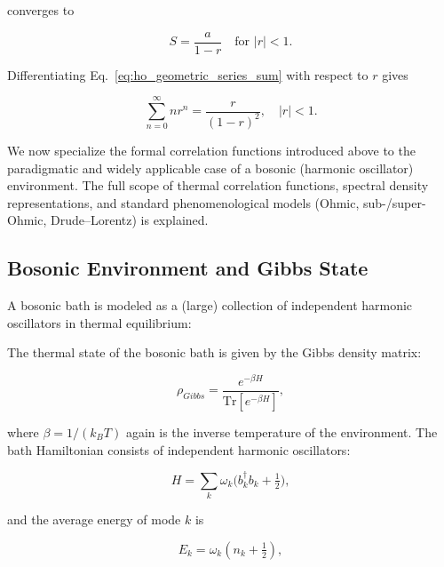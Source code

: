 \noindent
converges to

\begin{equation} \label{eq:ho_geometric_series_sum}
	S = \frac{a}{1-r} \quad \text{for } |r|<1.
\end{equation}

\noindent
Differentiating Eq.~\eqref{eq:ho_geometric_series_sum} with respect to $r$ gives

\begin{equation} \label{eq:ho_derivation_geometric_sum}
	\sum_{n=0}^{\infty} n r^n = \frac{r}{(1-r)^2}, \quad |r|<1.
\end{equation}

\noindent
We now specialize the formal correlation functions introduced above to the paradigmatic and widely applicable case of a bosonic (harmonic oscillator) environment. The full scope of thermal correlation functions, spectral density representations, and standard phenomenological models (Ohmic, sub-/super-Ohmic, Drude--Lorentz) is explained.


\subsection{Bosonic Environment and Gibbs State}
\label{subsec:bosonic_environment_gibbs}

\noindent
A bosonic bath is modeled as a (large) collection of independent harmonic oscillators in thermal equilibrium:

The thermal state of the bosonic bath is given by the Gibbs density matrix:

\begin{equation} \label{eq:ho_gibbs_state}
    \rho_{Gibbs} = \frac{e^{-\beta H}}{\mathrm{Tr}[e^{-\beta H}]},
\end{equation}

\noindent
where $\beta = 1/(k_B T)$ again is the inverse temperature of the environment. The bath Hamiltonian consists of independent harmonic oscillators:

\begin{equation}
    H = \sum_k \omega_k \Big(b_k^{\dagger} b_k + \tfrac{1}{2}\Big),
	\label{eq:ho_bath_hamiltonian}
\end{equation}

\noindent
and the average energy of mode $k$ is

\begin{equation}
    E_k = \omega_k (n_k + \tfrac{1}{2}),
\end{equation}

